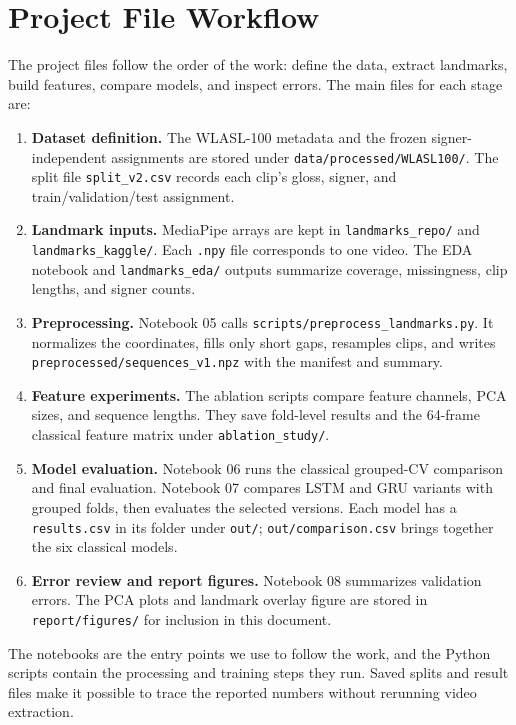 \documentclass[12pt,a4paper,oneside]{report}
\begin{document}
\chapter*{Project File Workflow}
The project files follow the order of the work: define the data, extract landmarks, build features, compare models, and inspect errors. The main files for each stage are:
\begin{enumerate}[leftmargin=*]
  \item \textbf{Dataset definition.} The WLASL-100 metadata and the frozen signer-independent assignments are stored under \texttt{data/processed/WLASL100/}. The split file \texttt{split\_v2.csv} records each clip's gloss, signer, and train/validation/test assignment.
  \item \textbf{Landmark inputs.} MediaPipe arrays are kept in \texttt{landmarks\_repo/} and \texttt{landmarks\_kaggle/}. Each \texttt{.npy} file corresponds to one video. The EDA notebook and \texttt{landmarks\_eda/} outputs summarize coverage, missingness, clip lengths, and signer counts.
  \item \textbf{Preprocessing.} Notebook 05 calls \texttt{scripts/preprocess\_landmarks.py}. It normalizes the coordinates, fills only short gaps, resamples clips, and writes \texttt{preprocessed/sequences\_v1.npz} with the manifest and summary.
  \item \textbf{Feature experiments.} The ablation scripts compare feature channels, PCA sizes, and sequence lengths. They save fold-level results and the 64-frame classical feature matrix under \texttt{ablation\_study/}.
  \item \textbf{Model evaluation.} Notebook 06 runs the classical grouped-CV comparison and final evaluation. Notebook 07 compares LSTM and GRU variants with grouped folds, then evaluates the selected versions. Each model has a \texttt{results.csv} in its folder under \texttt{out/}; \texttt{out/comparison.csv} brings together the six classical models.
  \item \textbf{Error review and report figures.} Notebook 08 summarizes validation errors. The PCA plots and landmark overlay figure are stored in \texttt{report/figures/} for inclusion in this document.
\end{enumerate}
The notebooks are the entry points we use to follow the work, and the Python scripts contain the processing and training steps they run. Saved splits and result files make it possible to trace the reported numbers without rerunning video extraction.
\end{document}
